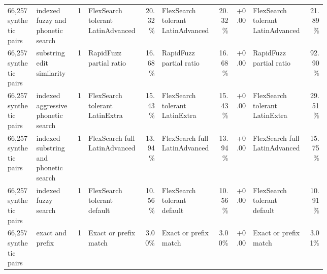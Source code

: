 \begin{landscape}
\begin{tiny}
\begin{longtable}{@{}L{0.09\linewidth}L{0.13\linewidth}rL{0.17\linewidth}rL{0.17\linewidth}rrL{0.17\linewidth}r@{}}
66,257 synthetic pairs & indexed fuzzy and phonetic search & 1 & FlexSearch tolerant LatinAdvanced & 20.32\% & FlexSearch tolerant LatinAdvanced & 20.32\% & +0.00 & FlexSearch tolerant LatinAdvanced & 21.89\% \\
66,257 synthetic pairs & substring edit similarity & 1 & RapidFuzz partial ratio & 16.68\% & RapidFuzz partial ratio & 16.68\% & +0.00 & RapidFuzz partial ratio & 92.90\% \\
66,257 synthetic pairs & indexed aggressive phonetic search & 1 & FlexSearch tolerant LatinExtra & 15.43\% & FlexSearch tolerant LatinExtra & 15.43\% & +0.00 & FlexSearch tolerant LatinExtra & 29.51\% \\
66,257 synthetic pairs & indexed substring and phonetic search & 1 & FlexSearch full LatinAdvanced & 13.94\% & FlexSearch full LatinAdvanced & 13.94\% & +0.00 & FlexSearch full LatinAdvanced & 15.75\% \\
66,257 synthetic pairs & indexed fuzzy search & 1 & FlexSearch tolerant default & 10.56\% & FlexSearch tolerant default & 10.56\% & +0.00 & FlexSearch tolerant default & 10.91\% \\
66,257 synthetic pairs & exact and prefix & 1 & Exact or prefix match & 3.00\% & Exact or prefix match & 3.00\% & +0.00 & Exact or prefix match & 3.01\% \\
\bottomrule
\end{longtable}
\end{tiny}


\end{landscape}
